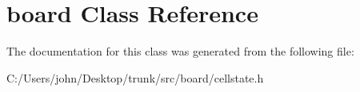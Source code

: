 \hypertarget{classboard}{}\section{board Class Reference}
\label{classboard}


The documentation for this class was generated from the following file\+:\begin{DoxyCompactItemize}
\item 
C\+:/\+Users/john/\+Desktop/trunk/src/board/cellstate.\+h\end{DoxyCompactItemize}
